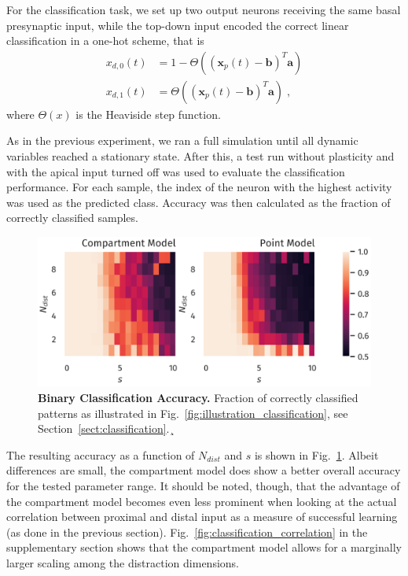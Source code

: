 \documentclass[10pt,a4paper,twocolumn]{article}
\begin{document}
		For the classification task, we set up two output neurons receiving
		the same basal presynaptic input, while the top-down input encoded
		the correct linear classification in a one-hot scheme, that is
		\begin{align}
			x_{d,0}(t) &= 1 - \Theta\left( \left(\mathbf{x}_p(t) - \mathbf{b}\right)^T \mathbf{a}\right) \\
			x_{d,1}(t) &= \Theta\left( \left(\mathbf{x}_p(t) - \mathbf{b}\right)^T \mathbf{a}\right) \; ,
		\end{align}
		where $\Theta(x)$ is the Heaviside step function.
		
		As in the previous experiment, we ran a full simulation until 
		all dynamic variables reached a stationary state. After this,
		a test run without plasticity and with the apical input turned off 
		was used to evaluate the classification	performance. 
		For each sample,
		the index of the neuron with the highest activity was used
		as the predicted class. Accuracy was then calculated as the fraction
		of correctly classified samples.
		\begin{figure}
			\includegraphics[width=\columnwidth]{classification_dimension_scaling}
			\caption{{\bf Binary Classification Accuracy.}
			Fraction of correctly classified patterns as illustrated in
			Fig.~\ref{fig:illustration_classification}, see 
			Section~\ref{sect:classification}.¸}
		\label{fig:classification_accuracy}
		\end{figure}
		
		The resulting accuracy as a function of $N_{dist}$ and $s$
		is shown in Fig.~\ref{fig:classification_accuracy}.
		Albeit differences are small, the compartment model does
		show a better overall accuracy for the tested parameter range.
		It should be noted, though, that the advantage of the compartment
		model becomes even less prominent when looking at the actual
		correlation between proximal and distal input as a
		measure of successful learning (as done in the previous section).
		Fig.~\ref{fig:classification_correlation} in the supplementary 
		section shows that the compartment model allows for a marginally
		larger scaling among the distraction dimensions.
		
\end{document}
